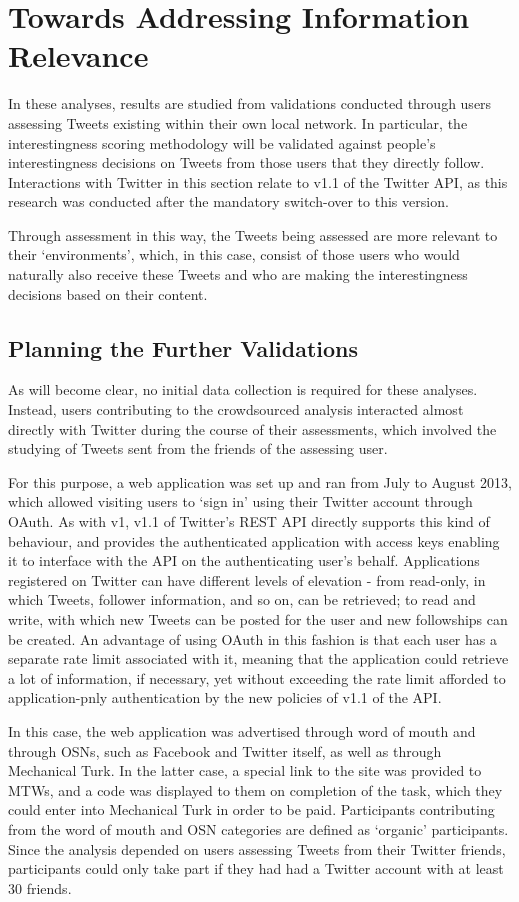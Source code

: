 \section{Towards Addressing Information Relevance}
In these analyses, results are studied from validations conducted through users assessing Tweets existing within their own local network. In particular, the interestingness scoring methodology will be validated against people's interestingness decisions on Tweets from those users that they directly follow. Interactions with Twitter in this section relate to v1.1 of the Twitter API, as this research was conducted after the mandatory switch-over to this version.

Through assessment in this way, the Tweets being assessed are more relevant to their `environments', which, in this case, consist of those users who would naturally also receive these Tweets and who are making the interestingness decisions based on their content.


\subsection{Planning the Further Validations}
As will become clear, no initial data collection is required for these analyses. Instead, users contributing to the crowdsourced analysis interacted almost directly with Twitter during the course of their assessments, which involved the studying of Tweets sent from the friends of the assessing user.

For this purpose, a web application was set up and ran from July to August 2013, which allowed visiting users to `sign in' using their Twitter account through OAuth. As with v1, v1.1 of Twitter's REST API directly supports this kind of behaviour, and provides the authenticated application with access keys enabling it to interface with the API on the authenticating user's behalf. Applications registered on Twitter can have different levels of elevation - from read-only, in which Tweets, follower information, and so on, can be retrieved; to read and write, with which new Tweets can be posted for the user and new followships can be created. An advantage of using OAuth in this fashion is that each user has a separate rate limit associated with it, meaning that the application could retrieve a lot of information, if necessary, yet without exceeding the rate limit afforded to application-pnly authentication by the new policies of v1.1 of the API.

In this case, the web application was advertised through word of mouth and through OSNs, such as Facebook and Twitter itself, as well as through Mechanical Turk. In the latter case, a special link to the site was provided to MTWs, and a code was displayed to them on completion of the task, which they could enter into Mechanical Turk in order to be paid. Participants contributing from the word of mouth and OSN categories are defined as `organic' participants. Since the analysis depended on users assessing Tweets from their Twitter friends, participants could only take part if they had had a Twitter account with at least 30 friends.

